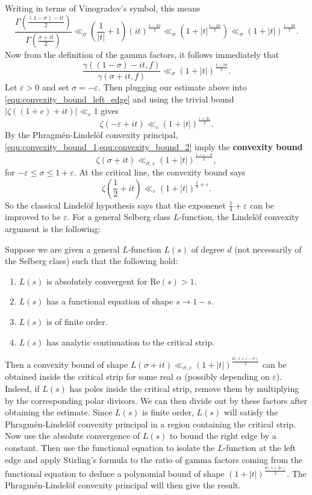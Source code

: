 \documentclass[12pt]{book}
\theoremstyle{definition}\newframedtheorem{method}{Method}
\renewcommand{\a}{\alpha}
\newcommand{\g}{\gamma}
\newcommand{\z}{\zeta}
\newcommand{\s}{\sigma}
\newcommand{\G}{\Gamma}
\newcommand{\e}{\varepsilon}
\newcommand{\<}{\langle}
\renewcommand{\>}{\rangle}
\renewcommand{\Re}{\mathrm{Re}}
\begin{document}
    Writing in terms of Vinogradov's symbol, this means
    \[
      \frac{\G\left(\frac{(1-\s)-it}{2}\right)}{\G\left(\frac{\s+it}{2}\right)} \ll_{\s} \left(\frac{1}{|t|}+1\right)(it)^{\frac{1-2\s}{2}} \ll_{\s} (1+|t|^{\frac{1-2\s}{2}}) \ll_{\s} (1+|t|)^{\frac{1-2\s}{2}}.
    \]
    Now from the definition of the gamma factors, it follows immediately that
    \[
     \frac{\g((1-\s)-it,f)}{\g(\s+it,f)} \ll_{\s} (1+|t|)^{\frac{1-2\s}{2}}.
    \]
    Let $\e > 0$ and set $\s = -\e$. Then plugging our estimate above into \cref{equ:convexity_bound_left_edge} and using the trivial bound $|\z((1+e)+it)| \ll_{e} 1$ gives
    \begin{equation}\label{equ:convexity_bound_2}
      \z(-\e+it) \ll_{\e} (1+|t|)^{\frac{1+2\e}{2}}.
    \end{equation}
    By the Phragm\'en-Lindel\"of convexity principal, \cref{equ:convexity_bound_1,equ:convexity_bound_2} imply the \textbf{convexity bound}
    \[
      \z(\s+it) \ll_{\s,\e} (1+|t|)^{\frac{1+\e-\s}{2}},
    \]
    for $-\e \le \s \le 1+\e$. At the critical line, the convexity bound says
    \begin{equation}\label{equ:convexity_bound_zeta_function}
      \z\left(\frac{1}{2}+it\right) \ll_{\e} (1+|t|)^{\frac{1}{4}+\e}.
    \end{equation}
    So the classical Lindel\"of hypothesis says that the exponenet $\frac{1}{4}+\e$ can be improved to be $\e$. For a general Selberg class $L$-function, the Lindel\"of convexity argument is the following:

    \begin{method}
      Suppose we are given a general $L$-function $L(s)$ of degree $d$ (not necessarily of the Selberg class) such that the following hold:
      \begin{enumerate}[label=(\roman*)]
        \item $L(s)$ is absolutely convergent for $\Re(s) > 1$.
        \item $L(s)$ has a functional equation of shape $s \to 1-s$.
        \item $L(s)$ is of finite order.
        \item $L(s)$ has analytic continuation to the critical strip.
      \end{enumerate}
      Then a convexity bound of shape $L(\s+it) \ll_{\s,\e} (1+|t|)^{\frac{d(1+\e-\s)}{2}}$ can be obtained inside the critical strip for some real $\a$ (possibly depending on $\e$). Indeed, if $L(s)$ has poles inside the critical strip, remove them by multiplying by the corresponding polar divisors. We can then divide out by these factors after obtaining the estimate. Since $L(s)$ is finite order, $L(s)$ will satisfy the Phragm\'en-Lindel\"of convexity principal in a region containing the critical strip. Now use the absolute convergence of $L(s)$ to bound the right edge by a constant. Then use the functional equation to isolate the $L$-function at the left edge and apply Stirling's formula to the ratio of gamma factors coming from the functional equation to deduce a polynomial bound of shape $(1+|t|)^{\frac{d(1+2\e)}{2}}$. The Phragm\'en-Lindel\"of convexity principal will then give the result.
    \end{method}
\end{document}
